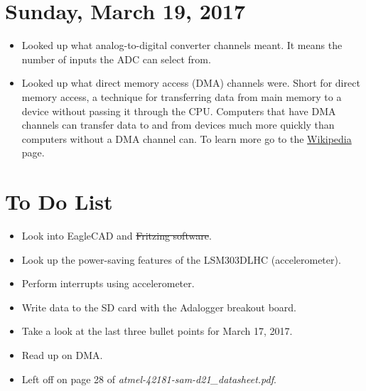\documentclass[12pt]{article}
\begin{document}
\section{Sunday, March 19, 2017}
\begin{itemize}
\item Looked up what analog-to-digital converter channels meant. It means the number of inputs the ADC can select from.
\item Looked up what direct memory access (DMA) channels were. Short for direct memory access, a technique for transferring data from main memory to a device without passing it through the CPU. Computers that have DMA channels can transfer data to and from devices much more quickly than computers without a DMA channel can. To learn more go to the \href{https://en.wikipedia.org/wiki/Direct_memory_access}{Wikipedia} page.
\end{itemize}

\section{To Do List}
\begin{itemize}
\item Look into EagleCAD and \sout{Fritzing software}.
\item Look up the power-saving features of the LSM303DLHC (accelerometer).
\item Perform interrupts using accelerometer.
\item Write data to the SD card with the Adalogger breakout board.
\item Take a look at the last three bullet points for March 17, 2017.
\item Read up on DMA.
\item Left off on page 28 of \textsl{atmel-42181-sam-d21\_datasheet.pdf}.
\end{itemize}
\end{document}
